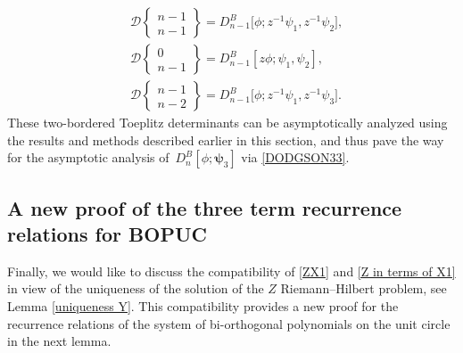 \documentclass[10pt,a4paper]{amsart}
\numberwithin{equation}{section}
\begin{document}
\begin{Remark}
\begin{align}
				&\mathcal{D}\left\lbrace \begin{matrix} n-1 \\ n-1 \end{matrix} \right\rbrace = D^B_{n-1}\big[\phi;z^{-1}\psi_1,z^{-1}\psi_2\big], \\
			&	\mathcal{D}\left\lbrace \begin{matrix} 0 \\ n-1 \end{matrix} \right\rbrace = D^B_{n-1}[z\phi;\psi_1,\psi_2], \\
			&	\mathcal{D}\left\lbrace \begin{matrix} n-1 \\ n-2 \end{matrix} \right\rbrace = D^B_{n-1}\big[\phi;z^{-1}\psi_1,z^{-1}\psi_3\big]. \label{E44}
			\end{align}
			These two-bordered Toeplitz determinants can be asymptotically analyzed using the results and methods described earlier in this section, and thus pave the way for the asymptotic analysis of~${D^B_n[\phi;\boldsymbol{\psi}_3]}$ via \eqref{DODGSON33}.
		\end{Remark}
		
		\subsection{A new proof of the three term recurrence relations for BOPUC}
		Finally, we would like to discuss the compatibility of \eqref{ZX1} and \eqref{Z in terms of X1} in view of the uniqueness of the solution of the $Z$ Riemann--Hilbert problem, see Lemma \ref{uniqueness Y}. This compatibility provides a new proof for the recurrence relations of the system of bi-orthogonal polynomials on the unit circle in the next lemma.
		
\end{document}

